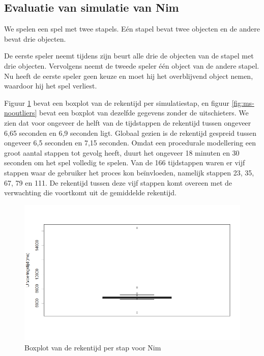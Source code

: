 \subsection{Evaluatie van simulatie van Nim}

We spelen een spel met twee stapels. E\'en stapel bevat twee objecten en de andere bevat drie objecten.

De eerste speler neemt tijdens zijn beurt alle drie de objecten van de stapel met drie objecten. Vervolgens neemt de tweede speler \'e\'en object van de andere stapel. Nu heeft de eerste speler geen keuze en moet hij het overblijvend object nemen, waardoor hij het spel verliest.

Figuur \ref{fig:ms} bevat een boxplot van de rekentijd per simulatiestap, en figuur \ref{fig:ms-nooutliers} bevat een boxplot van dezelfde gegevens zonder de uitschieters. We zien dat voor ongeveer de helft van de tijdstappen de rekentijd tussen ongeveer 6,65 seconden en 6,9 seconden ligt. Globaal gezien is de rekentijd gespreid tussen ongeveer 6,5 seconden en 7,15 seconden. Omdat een procedurale modellering een groot aantal stappen tot gevolg heeft, duurt het ongeveer 18 minuten en 30 seconden om het spel volledig te spelen. Van de 166 tijdstappen waren er vijf stappen waar de gebruiker het proces kon be\"invloeden, namelijk stappen 23, 35, 67, 79 en 111. De rekentijd tussen deze vijf stappen komt overeen met de verwachting die voortkomt uit de gemiddelde rekentijd.

\begin{figure}
	\includegraphics[width=1.05\textwidth]{chap-evaluatie/boxplot.png}
	\caption{Boxplot van de rekentijd per stap voor Nim}
	\label{fig:ms}
\end{figure}


